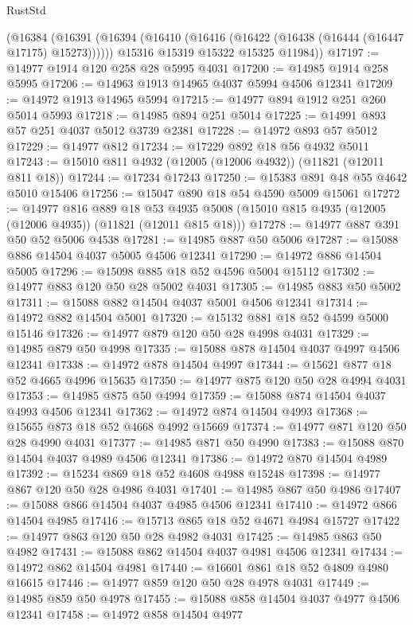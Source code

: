 \begin{lexlean}{RustStd}
\begin{coremodule}
    (@16384
      (@16391
        (@16394 (@16410 (@16416 (@16422 (@16438 (@16444 (@16447 @17175) @15273))))))
        @15316
        @15319
        @15322
        @15325
        @11984))
@17197 := @14977 @1914 @120 @258 @28 @5995 @4031
@17200 := @14985 @1914 @258 @5995
@17206 := @14963 @1913 @14965 @4037 @5994 @4506 @12341
@17209 := @14972 @1913 @14965 @5994
@17215 := @14977 @894 @1912 @251 @260 @5014 @5993
@17218 := @14985 @894 @251 @5014
@17225 := @14991 @893 @57 @251 @4037 @5012 @3739 @2381
@17228 := @14972 @893 @57 @5012
@17229 := @14977 @812
@17234 := @17229 @892 @18 @56 @4932 @5011
@17243 := @15010 @811 @4932 (@12005 (@12006 @4932)) (@11821 (@12011 @811 @18))
@17244 := @17234 @17243
@17250 := @15383 @891 @48 @55 @4642 @5010 @15406
@17256 := @15047 @890 @18 @54 @4590 @5009 @15061
@17272 := @14977
    @816
    @889
    @18
    @53
    @4935
    @5008
    (@15010 @815 @4935 (@12005 (@12006 @4935)) (@11821 (@12011 @815 @18)))
@17278 := @14977 @887 @391 @50 @52 @5006 @4538
@17281 := @14985 @887 @50 @5006
@17287 := @15088 @886 @14504 @4037 @5005 @4506 @12341
@17290 := @14972 @886 @14504 @5005
@17296 := @15098 @885 @18 @52 @4596 @5004 @15112
@17302 := @14977 @883 @120 @50 @28 @5002 @4031
@17305 := @14985 @883 @50 @5002
@17311 := @15088 @882 @14504 @4037 @5001 @4506 @12341
@17314 := @14972 @882 @14504 @5001
@17320 := @15132 @881 @18 @52 @4599 @5000 @15146
@17326 := @14977 @879 @120 @50 @28 @4998 @4031
@17329 := @14985 @879 @50 @4998
@17335 := @15088 @878 @14504 @4037 @4997 @4506 @12341
@17338 := @14972 @878 @14504 @4997
@17344 := @15621 @877 @18 @52 @4665 @4996 @15635
@17350 := @14977 @875 @120 @50 @28 @4994 @4031
@17353 := @14985 @875 @50 @4994
@17359 := @15088 @874 @14504 @4037 @4993 @4506 @12341
@17362 := @14972 @874 @14504 @4993
@17368 := @15655 @873 @18 @52 @4668 @4992 @15669
@17374 := @14977 @871 @120 @50 @28 @4990 @4031
@17377 := @14985 @871 @50 @4990
@17383 := @15088 @870 @14504 @4037 @4989 @4506 @12341
@17386 := @14972 @870 @14504 @4989
@17392 := @15234 @869 @18 @52 @4608 @4988 @15248
@17398 := @14977 @867 @120 @50 @28 @4986 @4031
@17401 := @14985 @867 @50 @4986
@17407 := @15088 @866 @14504 @4037 @4985 @4506 @12341
@17410 := @14972 @866 @14504 @4985
@17416 := @15713 @865 @18 @52 @4671 @4984 @15727
@17422 := @14977 @863 @120 @50 @28 @4982 @4031
@17425 := @14985 @863 @50 @4982
@17431 := @15088 @862 @14504 @4037 @4981 @4506 @12341
@17434 := @14972 @862 @14504 @4981
@17440 := @16601 @861 @18 @52 @4809 @4980 @16615
@17446 := @14977 @859 @120 @50 @28 @4978 @4031
@17449 := @14985 @859 @50 @4978
@17455 := @15088 @858 @14504 @4037 @4977 @4506 @12341
@17458 := @14972 @858 @14504 @4977

\end{coremodule}
\end{lexlean}
